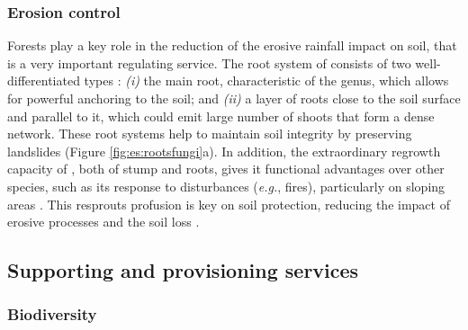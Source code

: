 \subsubsection{Erosion control}\label{sec:es:regulation-erosion}
Forests play a key role in the reduction of the erosive rainfall impact on soil, that is a very important regulating service. The root system of \Qp consists of two well-differentiated types \autocites{Allue1995OrdenacionMasas}: \emph{(i)} the main root, characteristic of the genus, which allows for powerful anchoring to the soil; and \emph{(ii)} a layer of roots close to the soil surface and parallel to it, which could emit large number of shoots that form a dense network. These root systems help to maintain soil integrity by preserving landslides \autocites{MesonMontoya1985VegetacionForestal,Salomonetal2017GeneralFailure} (Figure \ref{fig:es:rootsfungi}a). In addition, the extraordinary regrowth capacity of \Qp, both of stump and roots, gives it functional advantages over other species, such as its response to disturbances (\emph{e.g.}, fires), particularly on sloping areas \autocites{RuizdelaTorre2006FloraMayor,ValbuenaCarabanaGil2017CentenaryCoppicing}. This resprouts profusion is key on soil protection, reducing the impact of erosive processes and the soil loss \autocites{MesonGarcia1984BasesEcologicas}.

\subsection{Supporting and provisioning services}\label{sec:es:provision}
\subsubsection{Biodiversity}\label{sec:es:provision-biodiversity}

